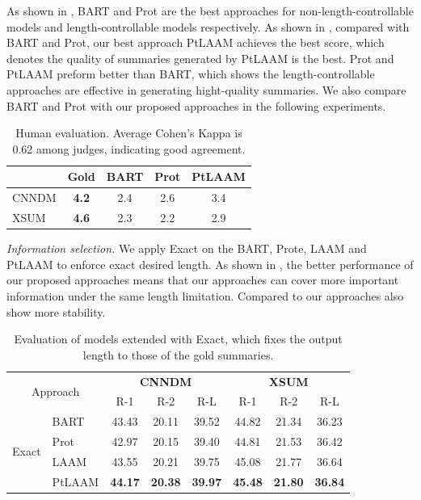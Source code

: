 As shown in , BART and Prot are the best approaches for non-length-controllable models and length-controllable models respectively.
As shown in , compared with BART and Prot,
our best approach PtLAAM achieves the best score, which denotes the quality of
summaries generated by PtLAAM is the best.
Prot and PtLAAM preform better than BART, 
which shows the length-controllable approaches
are effective in generating hight-quality summaries.
We also compare BART and Prot with our proposed approaches in the following experiments.

\begin{table}[th]
	\centering
	\scriptsize
	\begin{tabular}{|l|c|c|c|c|}
		\hline 
		& Gold & BART & Prot & PtLAAM\\
		\hline
		CNNDM & \bf{4.2} &  2.4 & 2.6 & 3.4 \\
		XSUM &\bf{4.6} & 2.3 & 2.2 & 2.9 \\
		\hline
	\end{tabular}
	\caption{Human evaluation. Average Cohen's Kappa is 0.62 among judges,
indicating good agreement. 
	}\label{tab:human}  
\end{table}


\textit{Information selection.} 
We apply Exact on the BART, Prote, LAAM and PtLAAM to enforce exact desired length.
As shown in , the better performance of our proposed approaches means that 
our approaches can cover more important information under the same length limitation. 
Compared to  our approaches also show more stability.

\begin{table}[th]
	\centering
	\scriptsize
	\begin{tabular}{|c|m{0.8cm}<{\raggedleft}|c|c|c|c|c|c|}
		\hline
		\multicolumn{2}{|c|}{\multirow{2}{*}{Approach}} & \multicolumn{3}{c|}{\bf CNNDM} &  \multicolumn{3}{c|}{\bf XSUM} \\ \cline{3-8}
		\multicolumn{2}{|c|}{\multirow{2}{*}{}}& R-1 & R-2 & R-L& R-1 & R-2 & R-L \\
		\hline
		\multirow{4}{*}{Exact} & BART 
		            & 43.43& 20.11 & 39.52 & 44.82 & 21.34 & 36.23  \\
     &   Prot & 42.97 & 20.15  & 39.40 &44.81 & 21.53 & 36.42  \\
     &  LAAM & 43.55& 20.21 & 39.75 & 45.08 & 21.77 & 36.64 \\
& PtLAAM & \bf 44.17&\bf 20.38 &\bf 39.97  & \bf 45.48 &\bf 21.80 & \bf 36.84  \\
		\hline
	\end{tabular}
	\caption{Evaluation of models extended with Exact, which fixes
the output length to those of the gold summaries.}\label{tab:exact}  
\end{table}


